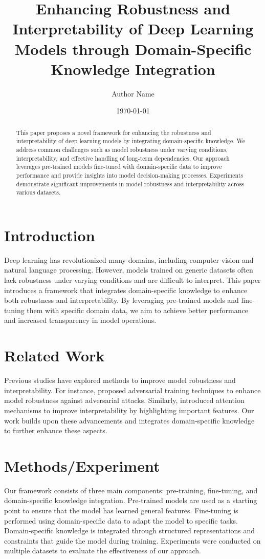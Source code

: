 \documentclass{article}
\title{Enhancing Robustness and Interpretability of Deep Learning Models through Domain-Specific Knowledge Integration}
\author{Author Name}
\date{\today}
\begin{document}
\maketitle

\begin{abstract}
This paper proposes a novel framework for enhancing the robustness and interpretability of deep learning models by integrating domain-specific knowledge. We address common challenges such as model robustness under varying conditions, interpretability, and effective handling of long-term dependencies. Our approach leverages pre-trained models fine-tuned with domain-specific data to improve performance and provide insights into model decision-making processes. Experiments demonstrate significant improvements in model robustness and interpretability across various datasets.
\end{abstract}

\section{Introduction}
Deep learning has revolutionized many domains, including computer vision and natural language processing. However, models trained on generic datasets often lack robustness under varying conditions and are difficult to interpret. This paper introduces a framework that integrates domain-specific knowledge to enhance both robustness and interpretability. By leveraging pre-trained models and fine-tuning them with specific domain data, we aim to achieve better performance and increased transparency in model operations.

\section{Related Work}
Previous studies have explored methods to improve model robustness and interpretability. For instance, \cite{DBLP:journals/corr/abs-1907-10193} proposed adversarial training techniques to enhance model robustness against adversarial attacks. Similarly, \cite{DBLP:journals/corr/abs-1810-03543} introduced attention mechanisms to improve interpretability by highlighting important features. Our work builds upon these advancements and integrates domain-specific knowledge to further enhance these aspects.

\section{Methods/Experiment}
Our framework consists of three main components: pre-training, fine-tuning, and domain-specific knowledge integration. Pre-trained models are used as a starting point to ensure that the model has learned general features. Fine-tuning is performed using domain-specific data to adapt the model to specific tasks. Domain-specific knowledge is integrated through structured representations and constraints that guide the model during training. Experiments were conducted on multiple datasets to evaluate the effectiveness of our approach.
\end{document}

